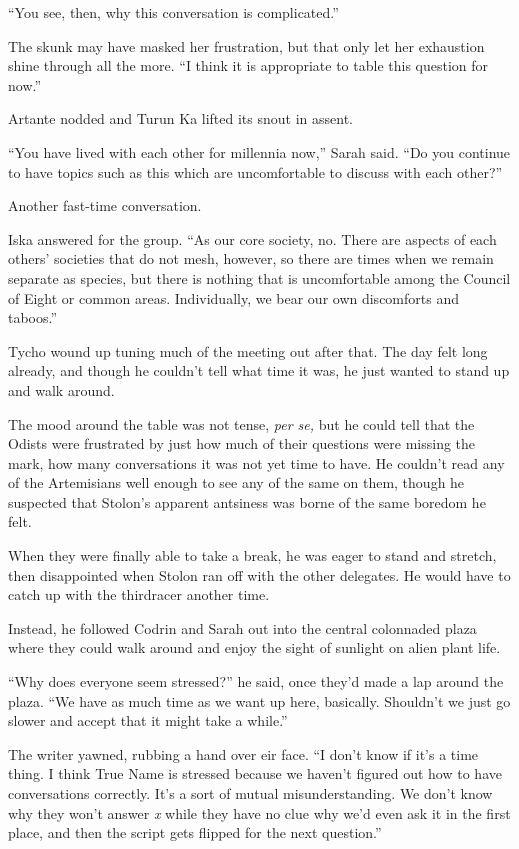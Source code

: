 ``You see, then, why this conversation is complicated.''

The skunk may have masked her frustration, but that only let her exhaustion shine through all the more. ``I think it is appropriate to table this question for now.''

Artante nodded and Turun Ka lifted its snout in assent.

``You have lived with each other for millennia now,'' Sarah said. ``Do you continue to have topics such as this which are uncomfortable to discuss with each other?''

Another fast-time conversation.

Iska answered for the group. ``As our core society, no. There are aspects of each others' societies that do not mesh, however, so there are times when we remain separate as species, but there is nothing that is uncomfortable among the Council of Eight or common areas. Individually, we bear our own discomforts and taboos.''

Tycho wound up tuning much of the meeting out after that. The day felt long already, and though he couldn't tell what time it was, he just wanted to stand up and walk around.

The mood around the table was not tense, \emph{per se,} but he could tell that the Odists were frustrated by just how much of their questions were missing the mark, how many conversations it was not yet time to have. He couldn't read any of the Artemisians well enough to see any of the same on them, though he suspected that Stolon's apparent antsiness was borne of the same boredom he felt.

When they were finally able to take a break, he was eager to stand and stretch, then disappointed when Stolon ran off with the other delegates. He would have to catch up with the thirdracer another time.

Instead, he followed Codrin and Sarah out into the central colonnaded plaza where they could walk around and enjoy the sight of sunlight on alien plant life.

``Why does everyone seem stressed?'' he said, once they'd made a lap around the plaza. ``We have as much time as we want up here, basically. Shouldn't we just go slower and accept that it might take a while.''

The writer yawned, rubbing a hand over eir face. ``I don't know if it's a time thing. I think True Name is stressed because we haven't figured out how to have conversations correctly. It's a sort of mutual misunderstanding. We don't know why they won't answer \emph{x} while they have no clue why we'd even ask it in the first place, and then the script gets flipped for the next question.''

